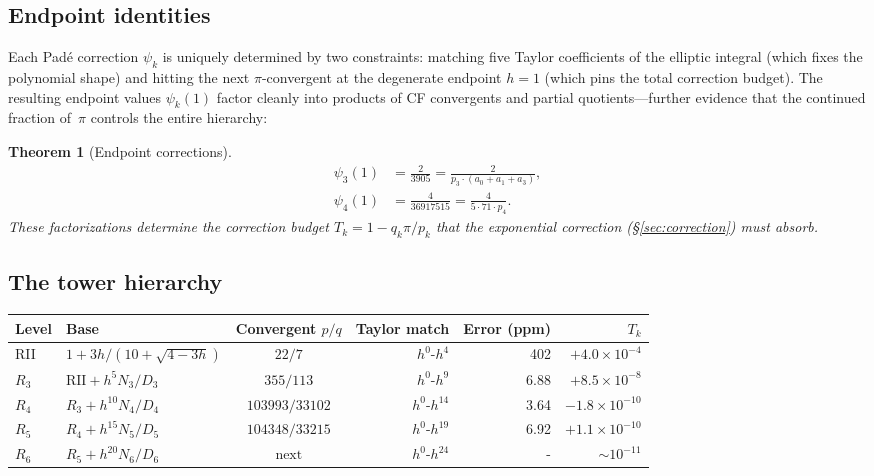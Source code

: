 \documentclass[12pt]{article}
\newtheorem{theorem}{Theorem}[section]
\begin{document}
\subsection{Endpoint identities}

Each Pad\'e correction $\psi_k$ is uniquely determined by two constraints: matching five Taylor coefficients of the elliptic integral (which fixes the polynomial shape) and hitting the next $\pi$-convergent at the degenerate endpoint $h=1$ (which pins the total correction budget).  The resulting endpoint values $\psi_k(1)$ factor cleanly into products of CF convergents and partial quotients---further evidence that the continued fraction of~$\pi$ controls the entire hierarchy:

\begin{theorem}[Endpoint corrections]\label{thm:endpoints}
\begin{align}
\psi_3(1) &= \frac{2}{3905} = \frac{2}{p_3 \cdot (a_0+a_1+a_3)}, \\
\psi_4(1) &= \frac{4}{36917515} = \frac{4}{5 \cdot 71 \cdot p_4}.
\end{align}
These factorizations determine the correction budget $T_k = 1 - q_k\pi/p_k$ that the exponential correction (\S\ref{sec:correction}) must absorb.
\end{theorem}

\subsection{The tower hierarchy}

\begin{center}\small
\begin{tabular}{l l c r r r}
\toprule
Level & Base & Convergent $p/q$ & Taylor match & Error (ppm) & $T_k$ \\
\midrule
RII & $1+3h/(10+\sqrt{4{-}3h})$ & $22/7$ & $h^0$-$h^4$ & 402 & $+4.0 \times 10^{-4}$ \\
$R_3$ & $\text{RII}+h^5 N_3/D_3$ & $355/113$ & $h^0$-$h^9$ & 6.88 & $+8.5 \times 10^{-8}$ \\
$R_4$ & $R_3+h^{10}N_4/D_4$ & $103993/33102$ & $h^0$-$h^{14}$ & 3.64 & $-1.8 \times 10^{-10}$ \\
$R_5$ & $R_4+h^{15}N_5/D_5$ & $104348/33215$ & $h^0$-$h^{19}$ & 6.92 & $+1.1 \times 10^{-10}$ \\
$R_6$ & $R_5+h^{20}N_6/D_6$ & $\text{next}$ & $h^0$-$h^{24}$ & - & ${\sim}10^{-11}$ \\
\bottomrule
\end{tabular}
\end{center}
\end{document}
